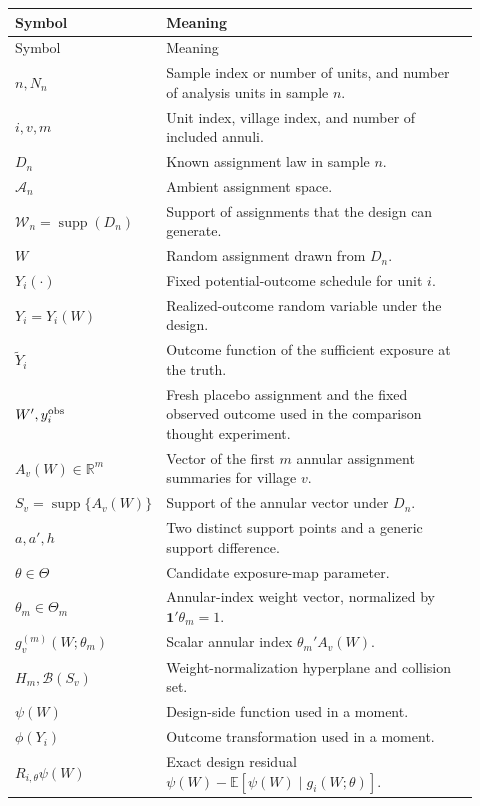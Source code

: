 \documentclass[11pt]{article}
\newcommand{\E}{\mathbb{E}}
\newcommand{\R}{\mathbb{R}}
\newcommand{\supp}{\operatorname{supp}}
\begin{document}
\begin{longtable}{>{\raggedright\arraybackslash}p{0.23\linewidth}
                  >{\raggedright\arraybackslash}p{0.69\linewidth}}
\toprule
Symbol & Meaning \\
\midrule
\endfirsthead
\toprule
Symbol & Meaning \\
\midrule
\endhead
\(n,N_n\) & Sample index or number of units, and number of analysis units in
sample \(n\). \\
\(i,v,m\) & Unit index, village index, and number of included annuli. \\
\(D_n\) & Known assignment law in sample \(n\). \\
\(\mathcal A_n\) & Ambient assignment space. \\
\(\mathcal W_n=\supp(D_n)\) & Support of assignments that the design can
generate. \\
\(W\) & Random assignment drawn from \(D_n\). \\
\(Y_i(\cdot)\) & Fixed potential-outcome schedule for unit \(i\). \\
\(Y_i=Y_i(W)\) & Realized-outcome random variable under the design. \\
\(\widetilde Y_i\) & Outcome function of the sufficient exposure at the truth. \\
\(W',y_i^{\rm obs}\) & Fresh placebo assignment and the fixed observed outcome
used in the comparison thought experiment. \\
\(A_v(W)\in\R^m\) & Vector of the first \(m\) annular assignment summaries for
village \(v\). \\
\(S_v=\supp\{A_v(W)\}\) & Support of the annular vector under \(D_n\). \\
\(a,a',h\) & Two distinct support points and a generic support difference. \\
\(\theta\in\Theta\) & Candidate exposure-map parameter. \\
\(\theta_m\in\Theta_m\) & Annular-index weight vector, normalized by
\(\mathbf 1'\theta_m=1\). \\
\(g_v^{(m)}(W;\theta_m)\) & Scalar annular index
\(\theta_m'A_v(W)\). \\
\(H_m,\mathcal B(S_v)\) & Weight-normalization hyperplane and collision set. \\
\(\psi(W)\) & Design-side function used in a moment. \\
\(\phi(Y_i)\) & Outcome transformation used in a moment. \\
\(R_{i,\theta}\psi(W)\) & Exact design residual
\(\psi(W)-\E[\psi(W)\mid g_i(W;\theta)]\). \\

\end{longtable}
\end{document}
